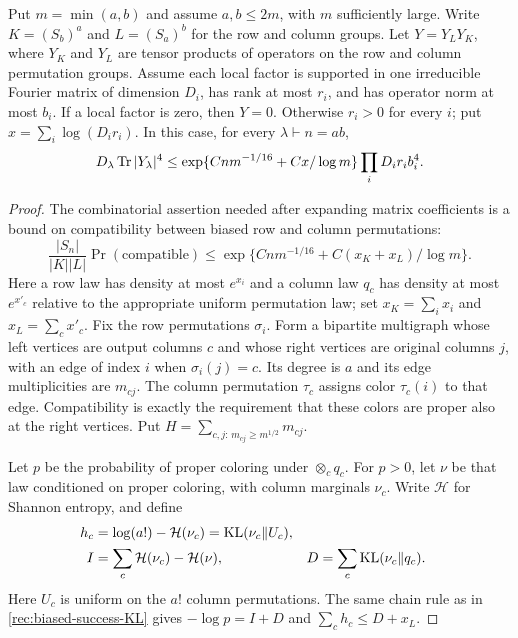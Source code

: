 \begin{lemma}\label{rec:band-grid-entropy}
Put $m=\min(a,b)$ and assume $a,b\le2m$, with $m$ sufficiently
large. Write $K=(S_b)^a$ and $L=(S_a)^b$ for the row and column
groups. Let $Y=Y_LY_K$, where $Y_K$ and $Y_L$ are tensor products
of operators on the row and column permutation groups. Assume each
local factor is supported in one irreducible Fourier matrix of
dimension $D_i$, has rank at most $r_i$, and has operator norm at
most $b_i$. If a local factor is zero, then $Y=0$. Otherwise
$r_i>0$ for every $i$; put $x=\sum_i\log(D_ir_i)$. In this case,
for every
$\lambda\vdash n=ab$,
\[
 D_\lambda\operatorname{Tr}|Y_\lambda|^4
 \le \exp\{Cn m^{-1/16}+Cx/\log m\}
                         \prod_i D_ir_i b_i^4.
\]
\end{lemma}
\begin{proof}
The combinatorial assertion needed after expanding matrix coefficients
is a bound on compatibility between biased row and column permutations:
\[
 \frac{|S_n|}{|K||L|}\Pr(\text{compatible})
 \le\exp\{Cn m^{-1/16}+C(x_K+x_L)/\log m\}.
\]
Here a row law has density at most $e^{x_i}$ and a column law $q_c$
has density at most $e^{x'_c}$ relative to the appropriate uniform
permutation law; set $x_K=\sum_i x_i$ and $x_L=\sum_cx'_c$.
Fix the row permutations $\sigma_i$.  Form a bipartite multigraph
whose left vertices are output columns $c$ and whose right vertices
are original columns $j$, with an edge of index $i$ when
$\sigma_i(j)=c$.  Its degree is $a$ and its edge multiplicities are
$m_{cj}$.  The column permutation $\tau_c$ assigns color $\tau_c(i)$
to that edge.  Compatibility is exactly the requirement that these
colors are proper also at the right vertices.  Put
$H=\sum_{c,j:\,m_{cj}\ge m^{1/2}}m_{cj}$.

Let $p$ be the probability of proper coloring under $\otimes_cq_c$.
For $p>0$, let $\nu$ be that law conditioned on proper coloring,
with column marginals $\nu_c$.  Write $\mathcal H$ for Shannon
entropy, and define
\begin{equation}\label{rec:band-conditioned-KL}
 \begin{aligned}
 h_c&=\log(a!)-\mathcal H(\nu_c)=\operatorname{KL}(\nu_c\Vert U_c),\\
 I&=\sum_c\mathcal H(\nu_c)-\mathcal H(\nu),
 &D&=\sum_c\operatorname{KL}(\nu_c\Vert q_c).
 \end{aligned}
\end{equation}
Here $U_c$ is uniform on the $a!$ column permutations.
The same chain rule as in \eqref{rec:biased-success-KL} gives
$-\log p=I+D$ and $\sum_ch_c\le D+x_L$.


\end{proof}
